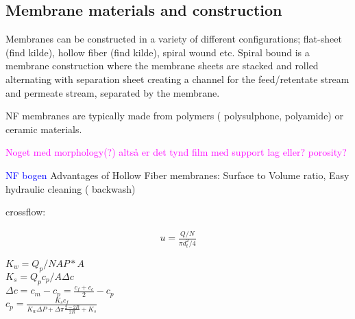 
\subsection{Membrane materials and construction}

Membranes can be constructed in a variety of different configurations; flat-sheet (find kilde), hollow fiber (find kilde), spiral wound etc. 
Spiral bound is a membrane construction where the membrane sheets are stacked and rolled alternating with separation sheet creating a channel for the feed/retentate stream and permeate stream, separated by the membrane. \citep{keo}

NF membranes are typically made from polymers ( polysulphone, polyamide) or ceramic materials.

\textcolor{magenta}{Noget med morphology(?) altså er det tynd film med support lag eller? porosity?}

\textcolor{blue}{NF bogen \citep{nanofiltration_2021_bog_fraMorten}}
Advantages of Hollow Fiber membranes: Surface to Volume ratio, Easy hydraulic cleaning ( backwash)


crossflow:

\begin{ceqn}
 \begin{align}
      u=\frac{Q/N}{\pi d_t^2/4}
    \end{align}
\end{ceqn}

 
 $K_w=Q_p/NAP*A$\\
 $K_s=Q_pc_p/A\Delta c$\\
 $\Delta c=c_m-c_p=\frac{c_f+c_c}{2}-c_p$\\
 $c_p=\frac{K_sc_f}{K_w\Delta P+\Delta \pi \frac{2-2R}{2R}+K_s}$

